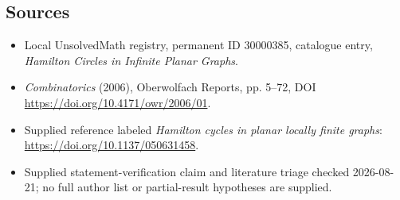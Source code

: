 \documentclass[11pt]{article}
\begin{document}
\subsection{Sources}
\begin{itemize}
\item Local UnsolvedMath registry, permanent ID 30000385, catalogue entry, \emph{Hamilton Circles in Infinite Planar Graphs}.
\item \emph{Combinatorics} (2006), Oberwolfach Reports, pp. 5--72, DOI \url{https://doi.org/10.4171/owr/2006/01}.
\item Supplied reference labeled \emph{Hamilton cycles in planar locally finite graphs}: \url{https://doi.org/10.1137/050631458}.
\item Supplied statement-verification claim and literature triage checked 2026-08-21; no full author list or partial-result hypotheses are supplied.
\end{itemize}
\end{document}
